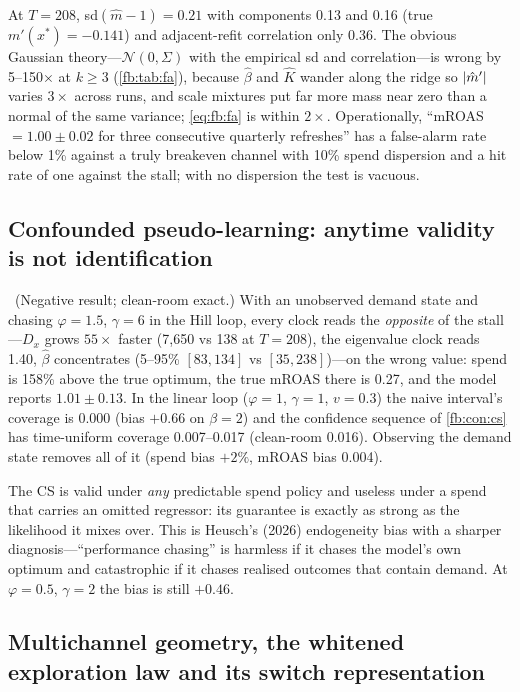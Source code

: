 At $T = 208$, sd$(\hat m - 1) = 0.21$ with components 0.13 and 0.16 (true $m'(x^*) = -0.141$) and adjacent-refit correlation only 0.36. The obvious Gaussian theory---$\mathcal N(0, \Sigma)$ with the empirical sd and correlation---is wrong by 5--150$\times$ at $k \ge 3$ (\cref{fb:tab:fa}), because $\hat\beta$ and $\hat K$ wander along the ridge so $\left|\hat m'\right|$ varies $3\times$ across runs, and scale mixtures put far more mass near zero than a normal of the same variance; \cref{eq:fb:fa} is within $2\times$. Operationally, ``mROAS $= 1.00 \pm 0.02$ for three consecutive quarterly refreshes'' has a false-alarm rate below 1\% against a truly breakeven channel with 10\% spend dispersion and a hit rate of one against the stall; with no dispersion the test is vacuous.

\subsection{Confounded pseudo-learning: anytime validity is not identification}

\begin{proposition}
\label{fb:prop:chase}
\tagEstablished\ (Negative result; clean-room exact.) With an unobserved demand state and chasing $\varphi = 1.5$, $\gamma = 6$ in the Hill loop, every clock reads the \emph{opposite} of the stall---$D_x$ grows $55\times$ faster (7,650 vs 138 at $T = 208$), the eigenvalue clock reads 1.40, $\hat\beta$ concentrates (5--95\% $[83, 134]$ vs $[35, 238]$)---on the wrong value: spend is 158\% above the true optimum, the true mROAS there is 0.27, and the model reports $1.01 \pm 0.13$. In the linear loop ($\varphi = 1$, $\gamma = 1$, $v = 0.3$) the naive interval's coverage is 0.000 (bias $+0.66$ on $\beta = 2$) and the confidence sequence of \cref{fb:con:cs} has time-uniform coverage 0.007--0.017 (clean-room 0.016). Observing the demand state removes all of it (spend bias $+2\%$, mROAS bias 0.004).
\end{proposition}

The CS is valid under \emph{any} predictable spend policy and useless under a spend that carries an omitted regressor: its guarantee is exactly as strong as the likelihood it mixes over. This is Heusch's (2026) endogeneity bias with a sharper diagnosis---``performance chasing'' is harmless if it chases the model's own optimum and catastrophic if it chases realised outcomes that contain demand. At $\varphi = 0.5$, $\gamma = 2$ the bias is still $+0.46$.

\subsection{Multichannel geometry, the whitened exploration law and its switch representation}

